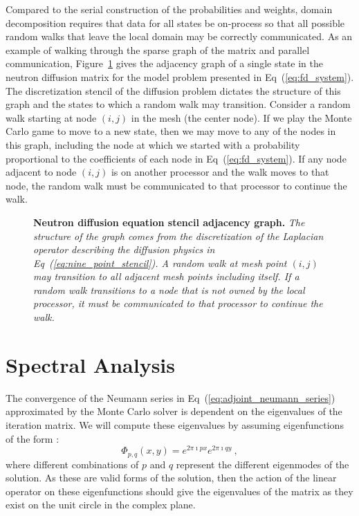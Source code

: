 \documentclass[preprint,11pt]{elsarticle}
\begin{document}
Compared to the serial construction of the probabilities and weights, domain
decomposition requires that data for all states be on-process so that all
possible random walks that leave the local domain may be correctly
communicated. As an example of walking through the sparse graph of the matrix
and parallel communication, Figure~\ref{fig:diffusion_graph} gives the
adjacency graph of a single state in the neutron diffusion matrix for the
model problem presented in Eq~(\ref{eq:fd_system}). The discretization stencil
of the diffusion problem dictates the structure of this graph and the states
to which a random walk may transition. Consider a random walk starting at node
$(i,j)$ in the mesh (the center node). If we play the Monte Carlo game to move
to a new state, then we may move to any of the nodes in this graph, including
the node at which we started with a probability proportional to the
coefficients of each node in Eq~(\ref{eq:fd_system}). If any node adjacent to
node $(i,j)$ is on another processor and the walk moves to that node, the
random walk must be communicated to that processor to continue the walk.

\begin{figure}[ht!]
  \begin{center}
    \scalebox{1.25}{  }
  \end{center}
  \caption{\textbf{Neutron diffusion equation stencil adjacency graph.}
    \textit{The structure of the graph comes from the discretization of the
      Laplacian operator describing the diffusion physics in
      Eq~(\ref{eq:nine_point_stencil}). A random walk at mesh point $(i,j)$
      may transition to all adjacent mesh points including itself. If a
      random walk transitions to a node that is not owned by the local
      processor, it must be communicated to that processor to continue the
      walk.}}
  \label{fig:diffusion_graph}
\end{figure}

\section{Spectral Analysis}
\label{sec:spectral_analysis}

The convergence of the Neumann series in
Eq~(\ref{eq:adjoint_neumann_series}) approximated by the Monte Carlo
solver is dependent on the eigenvalues of the iteration matrix. We
will compute these eigenvalues by assuming eigenfunctions of the form
\cite{leveque_finite_2007}:
\begin{equation}
  \Phi_{p,q}(x,y) = e^{2 \pi \imath p x} e^{2 \pi \imath q y}\:,
  \label{eq:eigenfunction_form}
\end{equation}
where different combinations of $p$ and $q$ represent the different
eigenmodes of the solution. As these are valid forms of the solution,
then the action of the linear operator on these eigenfunctions should
give the eigenvalues of the matrix as they exist on the unit circle in
the complex plane.
\end{document}
